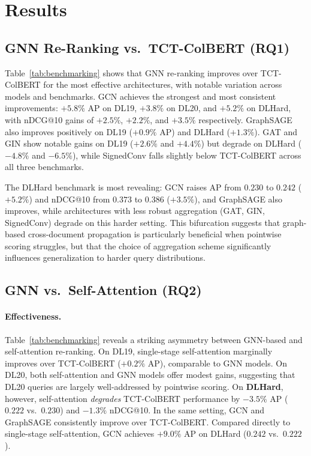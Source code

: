 \documentclass[runningheads]{llncs}
\begin{document}
\section{Results}

\subsection{GNN Re-Ranking vs.\ TCT-ColBERT (RQ1)}

Table~\ref{tab:benchmarking} shows that GNN re-ranking improves over TCT-ColBERT for the most effective architectures, with notable variation across models and benchmarks. GCN achieves the strongest and most consistent improvements: $+5.8\%$ AP on DL19, $+3.8\%$ on DL20, and $+5.2\%$ on DLHard, with nDCG@10 gains of $+2.5\%$, $+2.2\%$, and $+3.5\%$ respectively. GraphSAGE also improves positively on DL19 ($+0.9\%$ AP) and DLHard ($+1.3\%$). GAT and GIN show notable gains on DL19 ($+2.6\%$ and $+4.4\%$) but degrade on DLHard ($-4.8\%$ and $-6.5\%$), while SignedConv falls slightly below TCT-ColBERT across all three benchmarks.

The DLHard benchmark is most revealing: GCN raises AP from $0.230$ to $0.242$ ($+5.2\%$) and nDCG@10 from $0.373$ to $0.386$ ($+3.5\%$), and GraphSAGE also improves, while architectures with less robust aggregation (GAT, GIN, SignedConv) degrade on this harder setting. This bifurcation suggests that graph-based cross-document propagation is particularly beneficial when pointwise scoring struggles, but that the choice of aggregation scheme significantly influences generalization to harder query distributions.

\subsection{GNN vs.\ Self-Attention (RQ2)}

\paragraph{Effectiveness.}
Table~\ref{tab:benchmarking} reveals a striking asymmetry between GNN-based and self-attention re-ranking.
On DL19, single-stage self-attention marginally improves over TCT-ColBERT ($+0.2\%$ AP), comparable to GNN models.
On DL20, both self-attention and GNN models offer modest gains, suggesting that DL20 queries are largely well-addressed by pointwise scoring.
On \textbf{DLHard}, however, self-attention \emph{degrades} TCT-ColBERT performance by $-3.5\%$ AP ($0.222$ vs.\ $0.230$) and $-1.3\%$ nDCG@10. In the same setting, GCN and GraphSAGE consistently improve over TCT-ColBERT. Compared directly to single-stage self-attention, GCN achieves $+9.0\%$ AP on DLHard ($0.242$ vs.\ $0.222$).
\end{document}

